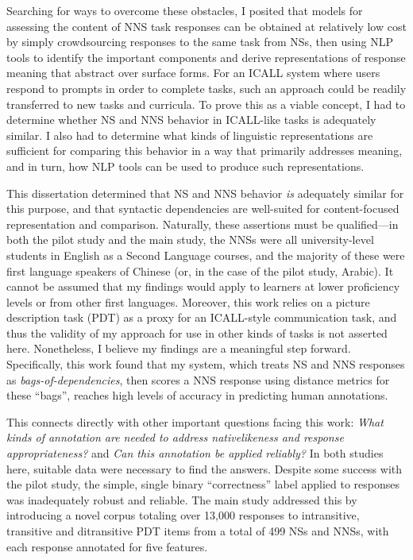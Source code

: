 Searching for ways to overcome these obstacles, I posited that models for assessing the content of NNS task responses can be obtained at relatively low cost by simply crowdsourcing responses to the same task from NSs, then using NLP tools to identify the important components and derive representations of response meaning that abstract over surface forms. For an ICALL system where users respond to prompts in order to complete tasks, such an approach could be readily transferred to new tasks and curricula. To prove this as a viable concept, I had to determine whether NS and NNS behavior in ICALL-like tasks is adequately similar. I also had to determine what kinds of linguistic representations are sufficient for comparing this behavior in a way that primarily addresses meaning, and in turn, how NLP tools can be used to produce such representations.

This dissertation determined that NS and NNS behavior \textit{is} adequately similar for this purpose, and that syntactic dependencies are well-suited for content-focused representation and comparison. Naturally, these assertions must be qualified---in both the pilot study and the main study, the NNSs were all university-level students in English as a Second Language courses, and the majority of these were first language speakers of Chinese (or, in the case of the pilot study, Arabic). It cannot be assumed that my findings would apply to learners at lower proficiency levels or from other first languages. Moreover, this work relies on a picture description task (PDT) as a proxy for an ICALL-style communication task, and thus the validity of my approach for use in other kinds of tasks is not asserted here. Nonetheless, I believe my findings are a meaningful step forward. Specifically, this work found that my system, which treats NS and NNS responses as \textit{bags-of-dependencies}, then scores a NNS response using distance metrics for these ``bags'', reaches high levels of accuracy in predicting human annotations.

This connects directly with other important questions facing this work: \textit{What kinds of annotation are needed to address nativelikeness and response appropriateness?} and \textit{Can this annotation be applied reliably?}
In both studies here, suitable data were necessary to find the answers. Despite some success with the pilot study, the simple, single binary ``correctness'' label applied to responses was inadequately robust and reliable. The main study addressed this by introducing a novel corpus totaling over 13,000 responses to intransitive, transitive and ditransitive PDT items from a total of 499 NSs and NNSs, with each response annotated for five features.

